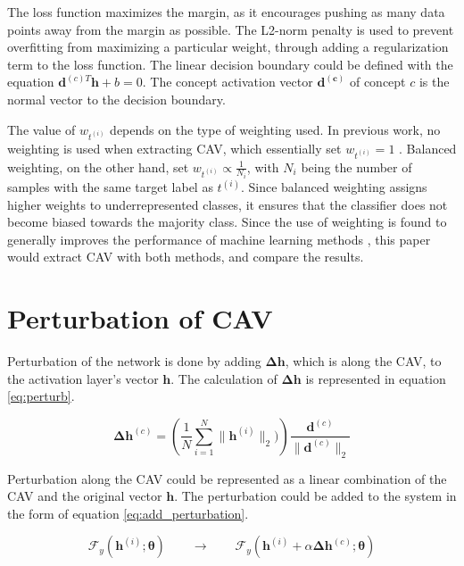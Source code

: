 The loss function maximizes the margin, as it encourages pushing as many data points away from the margin as possible. The L2-norm penalty is used to prevent overfitting from maximizing a particular weight, through adding a regularization term to the loss function. The linear decision boundary could be defined with the equation $\boldsymbol{d}^{(c)T}\boldsymbol{h} + b = 0$. The concept activation vector $\boldsymbol{d^{(c)}}$ of concept $c$ is the normal vector to the decision boundary.

The value of $w_{t^{(i)}}$ depends on the type of weighting used. In previous work, no weighting is used when extracting CAV, which essentially set $w_{t^{(i)}} = 1$ \cite{feature_bias}. Balanced weighting, on the other hand, set $w_{t^{(i)}} \propto \frac{1}{N_{i}}$, with $N_i$ being the number of samples with the same target label as $t^{(i)}$. Since balanced weighting assigns higher weights to underrepresented classes, it ensures that the classifier does not become biased towards the majority class. Since the use of weighting is found to generally improves the performance of machine learning methods \cite{balanced}, this paper would extract CAV with both methods, and compare the results.

\section{Perturbation of CAV}

Perturbation of the network is done by adding $\boldsymbol{\Delta h}$, which is along the CAV, to the activation layer's vector $\boldsymbol{h}$. The calculation of $\boldsymbol{\Delta h}$ is represented in equation \ref{eq:perturb}.

\begin{equation} \label{eq:perturb}
    \boldsymbol{\Delta h}^{(c)} = \left(\frac{1}{N}\sum_{i=1}^{N} \|\boldsymbol{h}^{(i)}\|_{2}) \right) \frac{ \boldsymbol{d}^{(c)}}{\| \boldsymbol{d}^{(c)}\|_2}
\end{equation}

Perturbation along the CAV could be represented as a linear combination of the CAV and the original vector $\boldsymbol{h}$. The perturbation could be added to the system in the form of equation \ref{eq:add_perturbation}.

\begin{equation} \label{eq:add_perturbation}
    \mathcal{F}_{y}(\boldsymbol{h}^{(i)}; \boldsymbol{\theta}) \qquad \rightarrow \qquad \mathcal{F}_{y}(\boldsymbol{h}^{(i)} + \alpha \boldsymbol{\Delta h}^{(c)}; \boldsymbol{\theta})
\end{equation}

